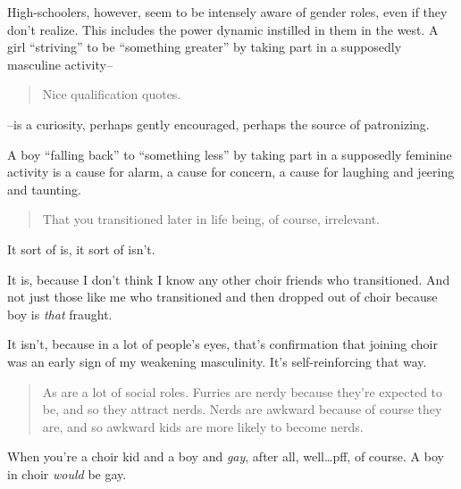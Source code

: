 High-schoolers, however, seem to be intensely aware of gender roles, even if they don't realize. This includes the power dynamic instilled in them in the west. A girl ``striving'' to be ``something greater'' by taking part in a supposedly masculine activity--

\begin{quote}
Nice qualification quotes.
\end{quote}

--is a curiosity, perhaps gently encouraged, perhaps the source of patronizing.

A boy ``falling back'' to ``something less'' by taking part in a supposedly feminine activity is a cause for alarm, a cause for concern, a cause for laughing and jeering and taunting.

\begin{quote}
That you transitioned later in life being, of course, irrelevant.
\end{quote}

It sort of is, it sort of isn't.

It is, because I don't think I know any other choir friends who transitioned. And not just those like me who transitioned and then dropped out of choir because boy is \emph{that} fraught.

It isn't, because in a lot of people's eyes, that's confirmation that joining choir was an early sign of my weakening masculinity. It's self-reinforcing that way.

\begin{quote}
As are a lot of social roles. Furries are nerdy because they're expected to be, and so they attract nerds. Nerds are awkward because of course they are, and so awkward kids are more likely to become nerds.
\end{quote}

When you're a choir kid and a boy and \emph{gay}, after all, well\ldots{}pff, of course. A boy in choir \emph{would} be gay.
